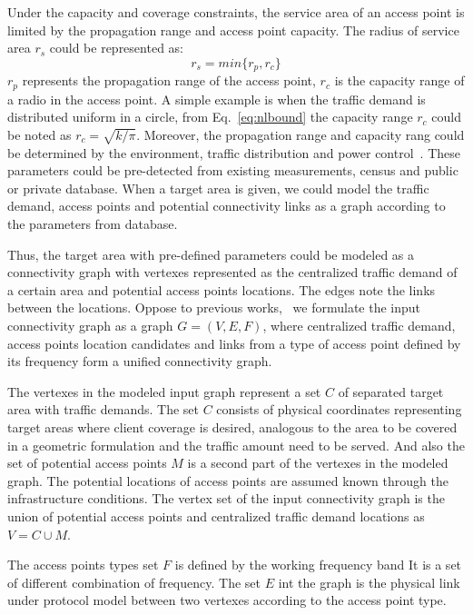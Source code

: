 Under the capacity and coverage constraints, the service area of an access point 
is limited by the propagation range and access point capacity. 
The radius of service area $r_s$ could be represented as:
\begin{equation}
\label{eq:servicearea}
r_s=min\{r_p,r_c\}
\end{equation}
$r_p$ represents the propagation range of the access point, $r_c$ is the capacity range of 
a radio in the access point. A simple example is when the traffic demand is distributed uniform in a circle, from 
Eq.~\ref{eq:nlbound} the capacity range $r_c$ could be noted as $r_c=\sqrt{k/\pi}$. 
Moreover, the propagation range and capacity rang could be determined by the environment, traffic distribution and
power control~\cite{robinson2010deploying}. 
These parameters could be pre-detected from existing measurements, census and public or private database.
When a target area is given, we could model the traffic demand, access points and
potential connectivity links as a graph according to the parameters from database.


Thus, the target area with pre-defined parameters could be modeled as a connectivity graph with 
vertexes represented as the centralized traffic demand of a certain area and potential access points
locations. The edges note the links between the locations. 
Oppose to previous works,~\cite{robinson2010deploying,franklin2007node,tang2005interference,irwin2013resource}
we formulate the input connectivity graph as a graph $G = (V,E,F)$, where centralized
traffic demand, access points location candidates and links from a type of access point defined by
its frequency form a unified connectivity graph. 

The vertexes in the modeled input graph represent a set $C$ of  separated target area with traffic demands.
The set $C$ consists of physical coordinates representing target areas where client coverage is 
desired, analogous to the area to be covered in a geometric formulation and the traffic amount
need to be served.
And also the set of potential access points $M$ is a second part of the vertexes in the 
modeled graph. The potential locations of access points are assumed known through the 
infrastructure conditions.
The vertex set of the input connectivity graph is the union of potential access points
and centralized traffic demand locations as $V = C\cup M$.

The access points types set $F$ is defined by the working frequency band 
It is a set of different combination of frequency.
The set $E$ int the graph is the physical link under protocol model between two vertexes 
according to the access point type.

